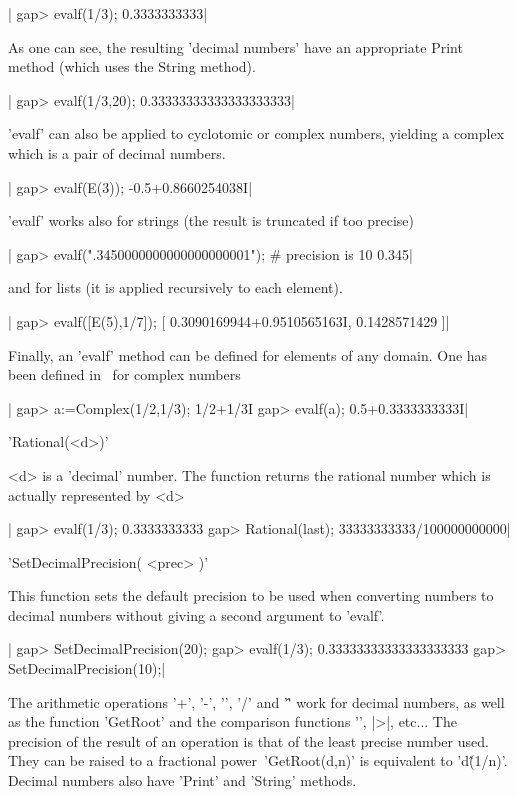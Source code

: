|    gap> evalf(1/3);
    0.3333333333|

As one  can see,  the resulting 'decimal  numbers' have  an appropriate
Print method (which uses the String method).

|    gap> evalf(1/3,20);
    0.33333333333333333333|

'evalf' can also be applied  to cyclotomic or complex numbers, yielding
a complex which is a pair of decimal numbers.

|    gap> evalf(E(3));
    -0.5+0.8660254038I|

'evalf' works also for strings (the result is truncated if too precise)

|    gap> evalf(".3450000000000000000001"); # precision is 10
    0.345|

and for lists (it is applied recursively to each element).

|    gap> evalf([E(5),1/7]);
    [ 0.3090169944+0.9510565163I, 0.1428571429 ]|

Finally, an 'evalf'  method can be defined for elements  of any domain.
One has been defined in \CHEVIE\ for complex numbers\:\

|    gap> a:=Complex(1/2,1/3);
    1/2+1/3I
    gap> evalf(a);
    0.5+0.3333333333I|


'Rational(<d>)'

<d>  is a  'decimal' number.  The function  returns the  rational number
which is actually represented by <d>

|    gap> evalf(1/3);
    0.3333333333
    gap> Rational(last);
    33333333333/100000000000|

%
%

'SetDecimalPrecision( <prec> )'

This function  sets the  default precision to  be used  when converting
numbers to decimal numbers without giving a second argument to 'evalf'.

|    gap> SetDecimalPrecision(20);
    gap> evalf(1/3);
    0.33333333333333333333
    gap> SetDecimalPrecision(10);|


The arithmetic operations '+', '-', '\*', '/' and '\^' work for decimal
numbers, as well as the function 'GetRoot' and the comparison functions
'\<', |>|, etc...  The precision of the result of  an operation is that
of the  least precise number used.  They can be raised  to a fractional
power\:\ 'GetRoot(d,n)'  is equivalent  to 'd\^(1/n)'.  Decimal numbers
also have 'Print' and 'String' methods.


